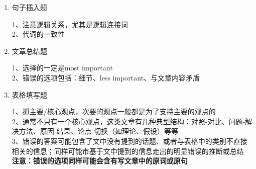 \documentclass[UTF8]{ctexart}
\begin{document}
\begin{enumerate}[A]
\item 句子插入题\par
1、注意逻辑关系，尤其是逻辑连接词\\
2、代词的一致性\\
\item 文章总结题\par
1、选择的一定是most important\\
2、错误的选项包括：细节、less important、与文章内容矛盾\\
\item 表格填写题\par
1、抓主要/核心观点，次要的观点一般都是为了支持主要的观点的\\
2、通常不只有一个核心观点，这类文章有几种典型结构：对照-对比、问题-解决方法、原因-结果、论点-切换（如理论、假设）等等\\
3、错误的答案可能包含了文中没有提到的话题、或者与表格中的类别不直接相关的信息；同样可能市基于文中提到的信息走出的明显错误的推断或总结\\
\textbf{注意：错误的选项同样可能会含有写文章中的原词或原句}
\end{enumerate}
\end{document}
